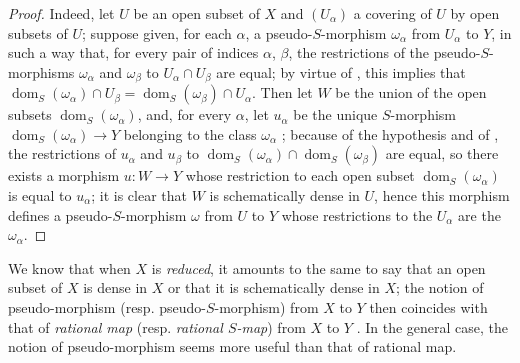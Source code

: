 \begin{proof}
Indeed, let $U$ be an open subset of $X$ and $(U_\alpha)$ a covering of $U$ by open subsets of $U$; suppose given, for each $\alpha$, a pseudo-$S$-morphism $\omega_\alpha$ from $U_\alpha$ to $Y$, in such a way that, for every pair of indices $\alpha$, $\beta$, the restrictions  of the pseudo-$S$-morphisms $\omega_\alpha$ and $\omega_\beta$ to $U_\alpha\cap U_\beta$ are equal; by virtue of , this implies that $\operatorname{dom}_S(\omega_\alpha)\cap U_\beta=\operatorname{dom}_S(\omega_\beta)\cap U_\alpha$.
Then let $W$ be the union of the open subsets $\operatorname{dom}_S(\omega_\alpha)$, and, for every $\alpha$, let $u_\alpha$ be the unique $S$-morphism $\operatorname{dom}_S(\omega_\alpha)\to Y$ belonging to the class $\omega_\alpha$ ; because of the hypothesis and of , the restrictions of $u_\alpha$ and $u_\beta$ to $\operatorname{dom}_S(\omega_\alpha)\cap\operatorname{dom}_S(\omega_\beta)$ are equal, so there exists a morphism $u:W\to Y$ whose restriction to each open subset $\operatorname{dom}_S(\omega_\alpha)$ is equal to $u_\alpha$; it is clear that $W$ is schematically dense in $U$, hence this morphism defines a pseudo-$S$-morphism $\omega$ from $U$ to $Y$ whose restrictions to the $U_\alpha$ are the $\omega_\alpha$.
\end{proof}

\begin{remark}[20.2.7]
\label{IV.20.2.7}
We know  that when $X$ is \emph{reduced}, it amounts to the same to say that an open subset of $X$ is dense in $X$ or that it is schematically dense in $X$; the notion of pseudo-morphism (resp. pseudo-$S$-morphism) from $X$ to $Y$ then coincides with that of \emph{rational map} (resp. \emph{rational $S$-map}) from $X$ to $Y$ .
In the general case, the notion of pseudo-morphism seems more useful than that of rational map.
\end{remark}

